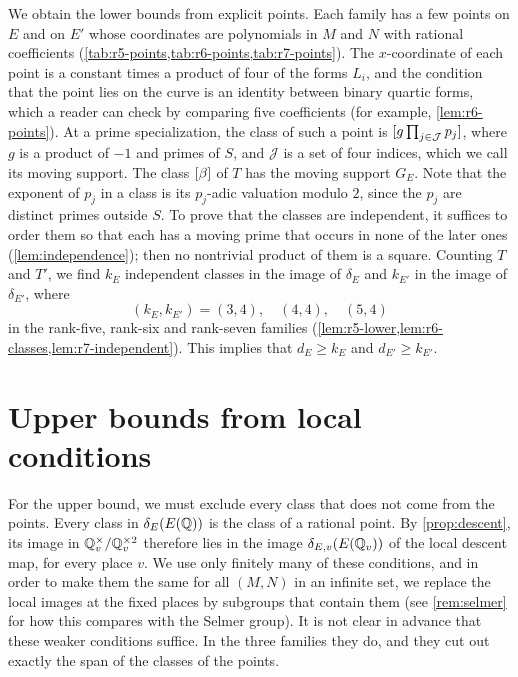 We obtain the lower bounds from explicit points. Each family has a few points on $E$ and on $E'$ whose coordinates are polynomials in $M$ and $N$ with rational coefficients (\cref{tab:r5-points,tab:r6-points,tab:r7-points}). The $x$-coordinate of each point is a constant times a product of four of the forms $L_i$, and the condition that the point lies on the curve is an identity between binary quartic forms, which a reader can check by comparing five coefficients (for example, \cref{lem:r6-points}). At a prime specialization, the class of such a point is $[g\prod_{j\in\mathcal J}p_j]$, where $g$ is a product of $-1$ and primes of $S$, and $\mathcal J$ is a set of four indices, which we call its moving support. The class $[\beta]$ of $T$ has the moving support $G_E$. Note that the exponent of $p_j$ in a class is its $p_j$-adic valuation modulo $2$, since the $p_j$ are distinct primes outside $S$. To prove that the classes are independent, it suffices to order them so that each has a moving prime that occurs in none of the later ones (\cref{lem:independence}); then no nontrivial product of them is a square. Counting $T$ and $T'$, we find $k_E$ independent classes in the image of $\delta_E$ and $k_{E'}$ in the image of $\delta_{E'}$, where
\begin{equation*}
(k_E,k_{E'})=(3,4),\quad(4,4),\quad(5,4)
\end{equation*}
in the rank-five, rank-six and rank-seven families (\cref{lem:r5-lower,lem:r6-classes,lem:r7-independent}). This implies that $d_E\ge k_E$ and $d_{E'}\ge k_{E'}$.

\section{Upper bounds from local conditions}\label{sec:overview-local}

For the upper bound, we must exclude every class that does not come from the points. Every class in $\delta_E(E(\mathbb Q))$ is the class of a rational point. By \cref{prop:descent}, its image in $\mathbb Q_v^{\times}/\mathbb Q_v^{\times2}$ therefore lies in the image $\delta_{E,v}(E(\mathbb Q_v))$ of the local descent map, for every place $v$. We use only finitely many of these conditions, and in order to make them the same for all $(M,N)$ in an infinite set, we replace the local images at the fixed places by subgroups that contain them (see \cref{rem:selmer} for how this compares with the Selmer group). It is not clear in advance that these weaker conditions suffice. In the three families they do, and they cut out exactly the span of the classes of the points.

